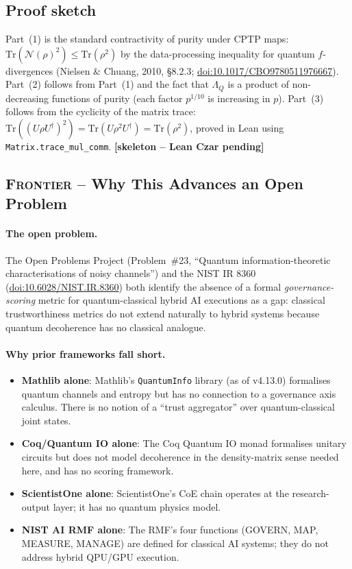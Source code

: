 \subsection*{Proof sketch}

Part~(1) is the standard contractivity of purity under CPTP maps:
$\mathrm{Tr}(\mathcal{N}(\rho)^2) \leq \mathrm{Tr}(\rho^2)$
by the data-processing inequality for quantum $f$-divergences
(Nielsen \& Chuang, 2010, \S{}8.2.3;
\href{https://doi.org/10.1017/CBO9780511976667}{doi:10.1017/CBO9780511976667}).
Part~(2) follows from Part~(1) and the fact that $\Lambda_Q$ is
a product of non-decreasing functions of purity
(each factor $p^{1/10}$ is increasing in $p$).  Part~(3) follows
from the cyclicity of the matrix trace:
$\mathrm{Tr}((U\rho U^\dagger)^2)
 = \mathrm{Tr}(U\rho^2 U^\dagger)
 = \mathrm{Tr}(\rho^2)$,
proved in Lean using \texttt{Matrix.trace\_mul\_comm}.
\hfill \textbf{[skeleton -- Lean Czar pending]}

\subsection*{\textsc{Frontier} -- Why This Advances an Open Problem}

\paragraph{The open problem.}
The Open Problems Project (Problem~\#23, ``Quantum information-theoretic
characterisations of noisy channels'') and the NIST IR 8360
(\href{https://doi.org/10.6028/NIST.IR.8360}{doi:10.6028/NIST.IR.8360})
both identify the absence of a formal \emph{governance-scoring} metric
for quantum-classical hybrid AI executions as a gap: classical
trustworthiness metrics do not extend naturally to hybrid systems
because quantum decoherence has no classical analogue.

\paragraph{Why prior frameworks fall short.}
\begin{itemize}
  \item \textbf{Mathlib alone}: Mathlib's
        \texttt{QuantumInfo} library (as of v4.13.0) formalises quantum
        channels and entropy but has no connection to a governance
        axis calculus.  There is no notion of a ``trust aggregator''
        over quantum-classical joint states.
  \item \textbf{Coq/Quantum IO alone}: The Coq Quantum IO monad
        formalises unitary circuits but does not model decoherence
        in the density-matrix sense needed here, and has no scoring
        framework.
  \item \textbf{ScientistOne alone}: ScientistOne's CoE chain
        operates at the research-output layer; it has no quantum
        physics model.
  \item \textbf{NIST AI RMF alone}: The RMF's four functions
        (GOVERN, MAP, MEASURE, MANAGE) are defined for classical AI
        systems; they do not address hybrid QPU/GPU execution.
\end{itemize}

